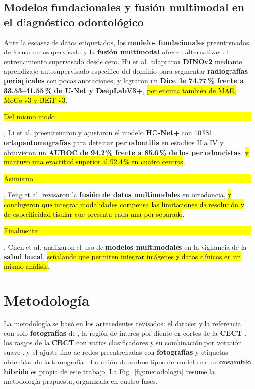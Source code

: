 \documentclass[runningheads]{llncs}
\newcommand{\prob}[1]{\textcolor{problema}{\textbf{#1}}}
\newcommand{\sol}[1]{\textcolor{solucion}{\textbf{#1}}}
\newcommand{\dat}[1]{\textcolor{dataset}{\textbf{#1}}}
\newcommand{\con}[1]{{\setlength{\fboxsep}{0.5pt}\colorbox{yellow}{\strut #1}}}
\newcommand{\res}[1]{\textcolor{resultado}{\textbf{#1}}}
\newcommand{\hal}[1]{{\sethlcolor{hallazgo}\hl{#1}}}
\newcommand{\prob}[1]{#1}
\newcommand{\sol}[1]{#1}
\newcommand{\dat}[1]{#1}
\newcommand{\con}[1]{#1}
\newcommand{\res}[1]{#1}
\newcommand{\hal}[1]{#1}
\begin{document}
\subsection{\sol{Modelos fundacionales y fusión multimodal} en el
\prob{diagnóstico odontológico}}
Ante la escasez de datos etiquetados, los \sol{modelos fundacionales}
preentrenados de forma autosupervisada y la \sol{fusión multimodal}
ofrecen alternativas al entrenamiento supervisado desde cero. Hu et
al. \cite{hu2025selfsupervised} adaptaron \sol{DINOv2} mediante
aprendizaje autosupervisado específico del dominio para segmentar
\dat{radiografías periapicales} con pocas anotaciones, y lograron un
\res{Dice de 74.77\,\% frente a 33.53--41.55\,\% de U-Net y DeepLabV3+},
\hal{por encima también de MAE, MoCo v3 y BEiT v3}. \con{Del mismo modo}, Li
et al. \cite{li2025hcnet} preentrenaron y ajustaron el modelo
\sol{HC-Net+} con 10\,881 \dat{ortopantomografías} para detectar
\prob{periodontitis} en estadios II a IV y obtuvieron un \res{AUROC de
94.2\,\% frente a 85.6\,\% de los periodoncistas}, \hal{y mantuvo una
exactitud superior al 92.4\,\% en cuatro centros}. \con{Asimismo},
Feng et al. \cite{feng2026multimodal} revisaron la \sol{fusión de datos
multimodales} en ortodoncia, \hal{y concluyeron que integrar modalidades
compensa las limitaciones de resolución y de especificidad tisular que
presenta cada una por separado}. \con{Finalmente}, Chen et al.
\cite{chen2026surveillance} analizaron el uso de \sol{modelos
multimodales} en la vigilancia de la \prob{salud bucal}, \hal{señalando
que permiten integrar imágenes y datos clínicos en un mismo análisis}.

\clearpage
\section{Metodología}
La metodología se basó en los antecedentes revisados: el dataset y la
referencia con solo \dat{fotografías} de \cite{liu2025fdtooth}, la
región de interés por diente en cortes de la \dat{CBCT}
\cite{xu2026swinunetr,wasserthal2023totalsegmentator}, los rasgos de la
\dat{CBCT} con varios clasificadores y su combinación por votación suave
\cite{song2024radiomics,sha2025radiomics}, y el ajuste fino de redes
preentrenadas con \dat{fotografías} y etiquetas obtenidas de la tomografía
\cite{li2026transverse,woo2023convnextv2}. La unión de ambos tipos de
modelo en un \sol{ensamble híbrido} es propia de este trabajo. La
Fig.~\ref{fig:metodologia} resume la metodología propuesta, organizada en
cuatro fases.
\end{document}
